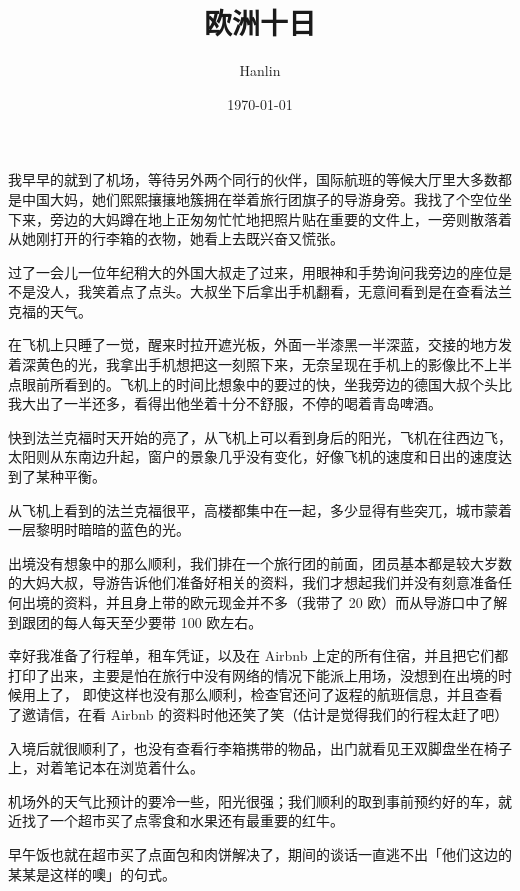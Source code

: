 \documentclass{ctexart}
\title{欧洲十日}
\author{Hanlin}
\date{\today}
\newcommand{\IMG}[1]{
	\begin{center}
	\makebox[\textwidth][c]{\texttt{[image: \#1]}}
	\end{center}
}
\newcommand{\IMGT}[2]{
	\begin{center}
	\makebox[\textwidth][c]{\texttt{[image: \#1]}}
	\makebox[\textwidth][r]{\footnotesize#2}
	\end{center}
}
\begin{document}
\makeatletter
{
	\noindent
	\Huge\@title
	\newline
	\newline
}
\makeatother

\IMGT{eu0.jpg}{去机场的路上}

我早早的就到了机场，等待另外两个同行的伙伴，国际航班的等候大厅里大多数都是中国大妈，她们熙熙攘攘地簇拥在举着旅行团旗子的导游身旁。我找了个空位坐下来，旁边的大妈蹲在地上正匆匆忙忙地把照片贴在重要的文件上，一旁则散落着从她刚打开的行李箱的衣物，她看上去既兴奋又慌张。

过了一会儿一位年纪稍大的外国大叔走了过来，用眼神和手势询问我旁边的座位是不是没人，我笑着点了点头。大叔坐下后拿出手机翻看，无意间看到是在查看法兰克福的天气。

\IMG{eu1.jpg}

在飞机上只睡了一觉，醒来时拉开遮光板，外面一半漆黑一半深蓝，交接的地方发着深黄色的光，我拿出手机想把这一刻照下来，无奈呈现在手机上的影像比不上半点眼前所看到的。飞机上的时间比想象中的要过的快，坐我旁边的德国大叔个头比我大出了一半还多，看得出他坐着十分不舒服，不停的喝着青岛啤酒。

\IMGT{eu2.jpg}{法兰克福的高楼}

快到法兰克福时天开始的亮了，从飞机上可以看到身后的阳光，飞机在往西边飞，太阳则从东南边升起，窗户的景象几乎没有变化，好像飞机的速度和日出的速度达到了某种平衡。

从飞机上看到的法兰克福很平，高楼都集中在一起，多少显得有些突兀，城市蒙着一层黎明时暗暗的蓝色的光。

出境没有想象中的那么顺利，我们排在一个旅行团的前面，团员基本都是较大岁数的大妈大叔，导游告诉他们准备好相关的资料，我们才想起我们并没有刻意准备任何出境的资料，并且身上带的欧元现金并不多（我带了 20 欧）而从导游口中了解到跟团的每人每天至少要带 100 欧左右。

幸好我准备了行程单，租车凭证，以及在 Airbnb 上定的所有住宿，并且把它们都打印了出来，主要是怕在旅行中没有网络的情况下能派上用场，没想到在出境的时候用上了， 即使这样也没有那么顺利，检查官还问了返程的航班信息，并且查看了邀请信，在看 Airbnb 的资料时他还笑了笑（估计是觉得我们的行程太赶了吧）

入境后就很顺利了，也没有查看行李箱携带的物品，出门就看见王双脚盘坐在椅子上，对着笔记本在浏览着什么。

机场外的天气比预计的要冷一些，阳光很强；我们顺利的取到事前预约好的车，就近找了一个超市买了点零食和水果还有最重要的红牛。

早午饭也就在超市买了点面包和肉饼解决了，期间的谈话一直逃不出「他们这边的某某是这样的噢」的句式。
\end{document}
